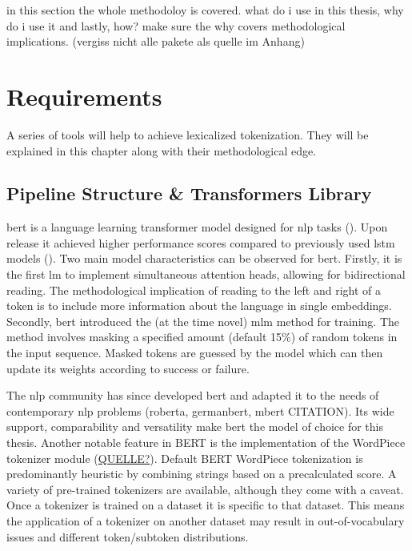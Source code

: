 \usepackage{biblatex}
\usepackage{booktabs}in this section the whole methodoloy is covered.
what do i use in this thesis, why do i use it and lastly, how?
make sure the why covers methodological implications.
(vergiss nicht alle pakete als quelle im Anhang)

\section{Requirements}
\label{sec:requirements}
A series of tools will help to achieve lexicalized tokenization.
They will be explained in this chapter along with their methodological edge.

\subsection{Pipeline Structure \& Transformers Library}
\label{subsec:architecture}

\ac{bert} is a language learning transformer model designed for \ac{nlp} tasks (\cite{ATTENTION}).
Upon release it achieved higher performance scores compared to previously used \ac{lstm} models (\cite{BERTHIGH1}).
Two main model characteristics can be observed for \ac{bert}.
Firstly, it is the first \ac{lm} to implement simultaneous attention heads, allowing for bidirectional reading.
The methodological implication of reading to the left and right of a token is to include more information about the language in single embeddings.
Secondly, \ac{bert} introduced the (at the time novel) \ac{mlm} method for training.
The method involves masking a specified amount (default 15\%) of random tokens in the input sequence.
Masked tokens are guessed by the model which can then update its weights according to success or failure.

The \ac{nlp} community has since developed \ac{bert} and adapted it to the needs of contemporary \ac{nlp} problems (roberta, germanbert, mbert \uppercase{citation}).
Its wide support, comparability and versatility make \ac{bert} the model of choice for this thesis.
Another notable feature in \uppercase{bert} is the implementation of the WordPiece tokenizer module (\uppercase{\href{https://huggingface.co/course/chapter6/6?fw=pt}{quelle?}}).
Default BERT WordPiece tokenization is predominantly heuristic by combining strings based on a precalculated score.
A variety of pre-trained tokenizers are available, although they come with a caveat.
Once a tokenizer is trained on a dataset it is specific to that dataset.
This means the application of a tokenizer on another dataset may result in out-of-vocabulary issues and different token/subtoken distributions.

